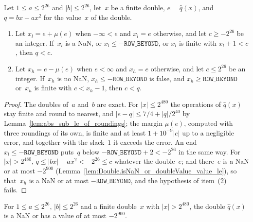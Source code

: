 \begin{lemma}\label{lem:Double.value_lt_of_marginLo}
  \leanok
  Let $1 \le a \le 2^{26}$ and $|b| \le 2^{26}$, let~$x$ be a finite double, $e = \widehat{q}(x)$,
  and $q = bx - ax^2$ for the value~$x$ of the double.
  \begin{enumerate}
    \item Let $x_l = e + \mu(e)$ when $-\infty < e$ and $x_l = e$ otherwise, and let
      $c \ge -2^{26}$ be an integer. If~$x_l$ is a NaN, or $x_l \le -\mathtt{ROW\_BEYOND}$, or
      $x_l$ is finite with $x_l + 1 < c$, then $q < c$.
    \item Let $x_h = e - \mu(e)$ when $e < \infty$ and $x_h = e$ otherwise, and let
      $c \le 2^{26}$ be an integer. If~$x_h$ is no NaN, $x_h \le -\mathtt{ROW\_BEYOND}$ is false,
      and $x_h \ge \mathtt{ROW\_BEYOND}$ or~$x_h$ is finite with $c < x_h - 1$, then $c < q$.
  \end{enumerate}
\end{lemma}

\begin{proof}
  \leanok
  The doubles of~$a$ and~$b$ are exact. For $|x| \le 2^{480}$ the operations of $\widehat{q}(x)$
  stay finite and round to nearest, and $|e - q| \le 7/4 + |q|/2^{40}$
  by Lemma~\ref{lem:abs_sub_le_of_roundings};
  the margin $\mu(e)$, computed with three roundings of its own, is finite and at least
  $1 + 10^{-9}|e|$ up to a negligible error, and together with the slack~$1$ it exceeds the error.
  An end $x_l \le -\mathtt{ROW\_BEYOND}$ puts~$q$ below $-\mathtt{ROW\_BEYOND} + 2 < -2^{26}$ in
  the same way. For $|x| > 2^{480}$, $q \le |bx| - ax^2 < -2^{26} \le c$ whatever the double~$e$;
  and there~$e$ is a NaN or at most $-2^{900}$
  (Lemma~\ref{lem:Double.isNaN_or_doubleValue_value_le}), so that~$x_h$ is a NaN or at most
  $-\mathtt{ROW\_BEYOND}$, and the hypothesis of item~(2) fails.
\end{proof}

\begin{lemma}\label{lem:Double.isNaN_or_doubleValue_value_le}
  \leanok
  For $1 \le a \le 2^{26}$, $|b| \le 2^{26}$ and a finite double~$x$ with $|x| > 2^{480}$, the
  double $\widehat{q}(x)$ is a NaN or has a value of at most $-2^{900}$.
\end{lemma}

